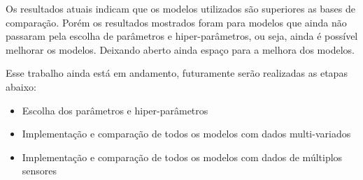 

Os resultados atuais indicam que os modelos utilizados são superiores as bases de comparação. Porém os resultados mostrados foram para modelos que ainda não passaram pela escolha de parâmetros e hiper-parâmetros, ou seja, ainda é possível melhorar os modelos. Deixando aberto ainda espaço para a melhora dos modelos.

Esse trabalho ainda está em andamento, futuramente serão realizadas as etapas abaixo:

\begin{itemize}
    \item Escolha dos parâmetros e hiper-parâmetros
    \item Implementação e comparação de todos os modelos com dados multi-variados
    \item Implementação e comparação de todos os modelos com dados de múltiplos sensores
\end{itemize}